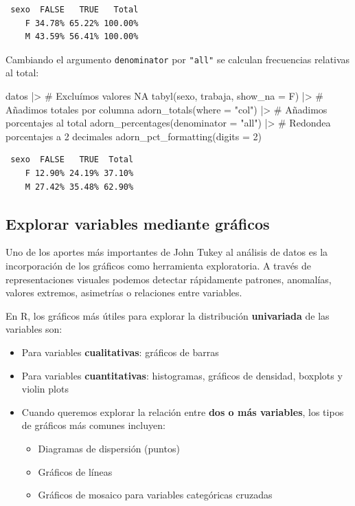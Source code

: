 \documentclass[
  spanish,
  letterpaper,
  DIV=11,
  numbers=noendperiod]{scrreprt}
\newenvironment{Shaded}{\begin{snugshade}}{\end{snugshade}}
\newcommand{\AttributeTok}[1]{\textcolor[rgb]{0.40,0.45,0.13}{#1}}
\newcommand{\CommentTok}[1]{\textcolor[rgb]{0.37,0.37,0.37}{#1}}
\newcommand{\DecValTok}[1]{\textcolor[rgb]{0.68,0.00,0.00}{#1}}
\newcommand{\FunctionTok}[1]{\textcolor[rgb]{0.28,0.35,0.67}{#1}}
\newcommand{\NormalTok}[1]{\textcolor[rgb]{0.00,0.23,0.31}{#1}}
\newcommand{\SpecialCharTok}[1]{\textcolor[rgb]{0.37,0.37,0.37}{#1}}
\newcommand{\StringTok}[1]{\textcolor[rgb]{0.13,0.47,0.30}{#1}}
\begin{document}
\begin{verbatim}
 sexo  FALSE   TRUE   Total
    F 34.78% 65.22% 100.00%
    M 43.59% 56.41% 100.00%
\end{verbatim}

Cambiando el argumento \texttt{denominator} por \texttt{"all"} se
calculan frecuencias relativas al total:

\begin{Shaded}
\begin{Highlighting}[]
\NormalTok{datos }\SpecialCharTok{|\textgreater{}}
  \CommentTok{\# Excluímos valores NA}
  \FunctionTok{tabyl}\NormalTok{(sexo, trabaja, }\AttributeTok{show\_na =}\NormalTok{ F) }\SpecialCharTok{|\textgreater{}}
  \CommentTok{\# Añadimos totales por columna}
  \FunctionTok{adorn\_totals}\NormalTok{(}\AttributeTok{where =} \StringTok{"col"}\NormalTok{) }\SpecialCharTok{|\textgreater{}}
  \CommentTok{\# Añadimos porcentajes al total}
  \FunctionTok{adorn\_percentages}\NormalTok{(}\AttributeTok{denominator =} \StringTok{"all"}\NormalTok{) }\SpecialCharTok{|\textgreater{}}
  \CommentTok{\# Redondea porcentajes a 2 decimales}
  \FunctionTok{adorn\_pct\_formatting}\NormalTok{(}\AttributeTok{digits =} \DecValTok{2}\NormalTok{)}
\end{Highlighting}
\end{Shaded}

\begin{verbatim}
 sexo  FALSE   TRUE  Total
    F 12.90% 24.19% 37.10%
    M 27.42% 35.48% 62.90%
\end{verbatim}

\subsection{Explorar variables mediante
gráficos}\label{explorar-variables-mediante-gruxe1ficos}

Uno de los aportes más importantes de John Tukey al análisis de datos es
la incorporación de los gráficos como herramienta exploratoria. A través
de representaciones visuales podemos detectar rápidamente patrones,
anomalías, valores extremos, asimetrías o relaciones entre variables.

En R, los gráficos más útiles para explorar la distribución
\textbf{univariada} de las variables son:

\begin{itemize}
\item
  Para variables \textbf{cualitativas}: gráficos de barras
\item
  Para variables \textbf{cuantitativas}: histogramas, gráficos de
  densidad, boxplots y violin plots
\item
  Cuando queremos explorar la relación entre \textbf{dos o más
  variables}, los tipos de gráficos más comunes incluyen:

  \begin{itemize}
  \item
    Diagramas de dispersión (puntos)
  \item
    Gráficos de líneas
  \item
    Gráficos de mosaico para variables categóricas cruzadas
  \end{itemize}
\end{itemize}
\end{document}
